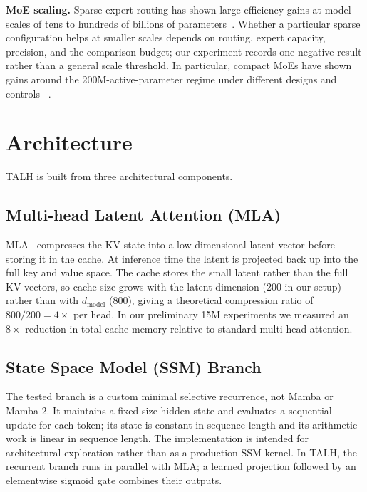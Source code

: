 \documentclass[conference]{IEEEtran}
\begin{document}
\textbf{MoE scaling.} Sparse expert routing has shown large efficiency gains
at model scales of tens to hundreds of billions of
parameters~\cite{deepseekv2}. Whether a particular sparse configuration helps
at smaller scales depends on routing, expert capacity, precision, and the
comparison budget; our experiment records one negative result rather than a
general scale threshold. In particular, compact MoEs have shown gains around
the 200M-active-parameter regime under different designs and controls
~\cite{cosmoe2025}.


\section{Architecture}
\label{sec:arch}

TALH is built from three architectural components.

\subsection{Multi-head Latent Attention (MLA)}

MLA~\cite{deepseekv2} compresses the KV state into a low-dimensional latent
vector before storing it in the cache. At inference time the latent is
projected back up into the full key and value space. The cache stores the
small latent rather than the full KV vectors, so cache size grows with the
latent dimension (200 in our setup) rather than with $d_{\text{model}}$ (800),
giving a theoretical compression ratio of $800/200 = 4\times$ per head. In
our preliminary 15M experiments we measured an $8\times$ reduction in total
cache memory relative to standard multi-head attention.

\subsection{State Space Model (SSM) Branch}

The tested branch is a custom minimal selective recurrence, not Mamba or
Mamba-2. It maintains a fixed-size hidden state and evaluates a sequential
update for each token; its state is constant in sequence length and its
arithmetic work is linear in sequence length. The implementation is intended
for architectural exploration rather than as a production SSM kernel. In TALH,
the recurrent branch runs in parallel with MLA; a learned projection followed
by an elementwise sigmoid gate combines their outputs.
\end{document}
